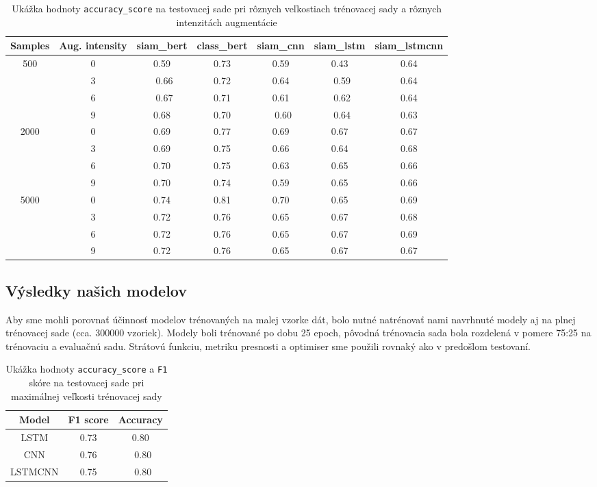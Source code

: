 \documentclass[a4paper, 16pt]{article}
\begin{document}
\begin{table}[H]
\centering
\begin{tabular}{ |c|c|c|c|c|c|c| } \hline
Samples & Aug. intensity & siam\_bert & class\_bert & siam\_cnn & siam\_lstm & siam\_lstmcnn\\ \hline
500 & 0 & 0.59 & 0.73 & 0.59 & 0.43 & 0.64\\
  & 3 & 0.66 & 0.72 & 0.64 & 0.59 & 0.64 \\
  & 6 & 0.67 & 0.71 & 0.61 & 0.62 & 0.64 \\
  & 9 & 0.68 & 0.70 & 0.60 & 0.64 & 0.63 \\ \hline
2000  & 0 & 0.69 & 0.77 & 0.69 & 0.67 & 0.67 \\
  & 3 & 0.69 & 0.75 & 0.66 & 0.64 & 0.68 \\
  & 6 & 0.70 & 0.75 & 0.63 & 0.65 & 0.66 \\
  & 9 & 0.70 & 0.74 & 0.59 & 0.65 & 0.66 \\ \hline
5000 & 0 & 0.74 & 0.81 & 0.70 & 0.65 & 0.69 \\
  & 3 & 0.72 & 0.76 & 0.65 & 0.67 & 0.68 \\
  & 6 & 0.72 & 0.76 & 0.65 & 0.67 & 0.69 \\
  & 9 & 0.72 & 0.76 & 0.65 & 0.67 & 0.67 \\
\hline
\end{tabular}
\caption{Ukážka hodnoty \texttt{accuracy\_score} na testovacej sade pri rôznych veľkostiach trénovacej sady a rôznych intenzitách augmentácie}
\label{table:ResultsAUG}
\end{table}

\subsection{Výsledky našich modelov}

Aby sme mohli porovnať účinnosť modelov trénovaných na malej vzorke dát, bolo nutné natrénovať nami navrhnuté modely aj na plnej trénovacej sade (cca. 300000 vzoriek). Modely boli trénované po dobu 25 epoch, pôvodná trénovacia sada bola rozdelená v pomere 75:25 na trénovaciu a evaluačnú sadu. Strátovú funkciu, metriku presnosti a optimiser sme použili rovnaký ako v predošlom testovaní.  

\begin{table}[H]
\centering
\begin{tabular}{ |c|c|c| } \hline
Model & F1 score & Accuracy\\ \hline
LSTM & 0.73 & 0.80\\
CNN  & 0.76 & 0.80\\
LSTMCNN  & 0.75 & 0.80\\
\hline
\end{tabular}
\caption{Ukážka hodnoty \texttt{accuracy\_score} a \texttt{F1} skóre na testovacej sade pri maximálnej veľkosti trénovacej sady}
\label{table:Results}
\end{table}
\end{document}
